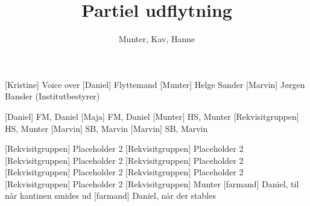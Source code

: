 \documentclass[a4paper,11pt]{article}
\title{Partiel udflytning}
\author{Munter, Kav, Hanne}
\begin{document}
\maketitle

\begin{roles}
[Kristine] Voice over
[Daniel] Flyttemand
[Munter] Helge Sander
[Marvin] Jørgen Bansler (Institutbestyrer)
\end{roles}

\begin{props}
[Daniel] FM, Daniel 
[Maja] FM, Daniel 
[Munter] HS, Munter 
[Rekvisitgruppen] HS, Munter 
[Marvin] SB, Marvin
[Marvin] SB, Marvin

[Rekvisitgruppen] Placeholder 2
[Rekvisitgruppen] Placeholder 2
[Rekvisitgruppen] Placeholder 2
[Rekvisitgruppen] Placeholder 2
[Rekvisitgruppen] Placeholder 2
[Rekvisitgruppen] Placeholder 2
[Rekvisitgruppen] Placeholder 2
[Rekvisitgruppen] Munter
[farmand] Daniel, til når kantinen smides ud
[farmand] Daniel, når der stables
\end{props}
\end{document}
